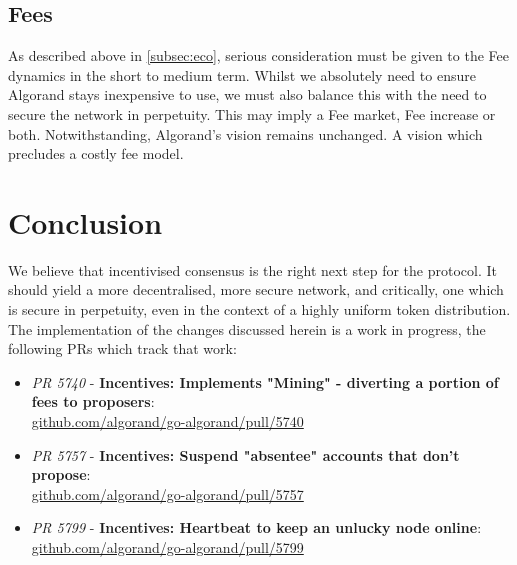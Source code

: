 \documentclass[11pt,a4paper]{article}
\begin{document}
\pagebreak

\subsection{Fees}
As described above in \ref{subsec:eco}, serious consideration must be given to the Fee dynamics in the short to medium 
term. Whilst we absolutely need to ensure Algorand stays inexpensive to use, we must also balance this with the need
to secure the network in perpetuity. This may imply a Fee market, Fee increase or both. Notwithstanding, Algorand's 
vision remains unchanged. A vision which precludes a costly fee model.

\pagebreak

\section{Conclusion}
We believe that incentivised consensus is the right next step for the protocol. It should yield a more decentralised,  
more secure network, and critically, one which is secure in perpetuity, even in the context of a highly uniform token
distribution. \\ 

The implementation of the changes discussed herein is a work in progress, the following PRs which track that work:

\begin{itemize}
    \item \emph{PR 5740} - \textbf{Incentives: Implements "Mining" - diverting a portion of fees to proposers}:\\
          \href{https://github.com/algorand/go-algorand/pull/5740}{github.com/algorand/go-algorand/pull/5740} \\
    \item \emph{PR 5757} - \textbf{Incentives: Suspend "absentee" accounts that don't propose}:\\
          \href{https://github.com/algorand/go-algorand/pull/5757}{github.com/algorand/go-algorand/pull/5757} \\
    \item \emph{PR 5799} - \textbf{Incentives: Heartbeat to keep an unlucky node online}:\\
          \href{https://github.com/algorand/go-algorand/pull/5799}{github.com/algorand/go-algorand/pull/5799}
\end{itemize}

\pagebreak

\printglossaries

\pagebreak
\end{document}
